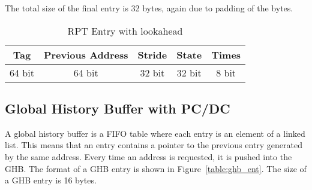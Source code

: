 The total size of the final entry is 32 bytes, again due to padding of
the bytes.

\begin{table}[h!]
  \centering
  \begin{tabular}{| c | c | c | c | c |}
    \hline
    Tag & Previous Address & Stride & State & Times \\ \hline
    64 bit & 64 bit & 32 bit & 32 bit & 8 bit \\ \hline
  \end{tabular}
  \caption{RPT Entry with lookahead}
  \label{table:entry_la}
\end{table}

\begin{center}
\label{figure:statemachine}
\end{center}

\subsection{Global History Buffer with PC/DC}

A global history buffer is a FIFO table where each entry is an
element of a linked list. This means that an entry contains a pointer
to the previous entry generated by the same address. Every time an
address is requested, it is pushed into the GHB. The format of a GHB
entry is shown in Figure~\ref{table:ghb_ent}. The size of a GHB entry
is 16 bytes.

